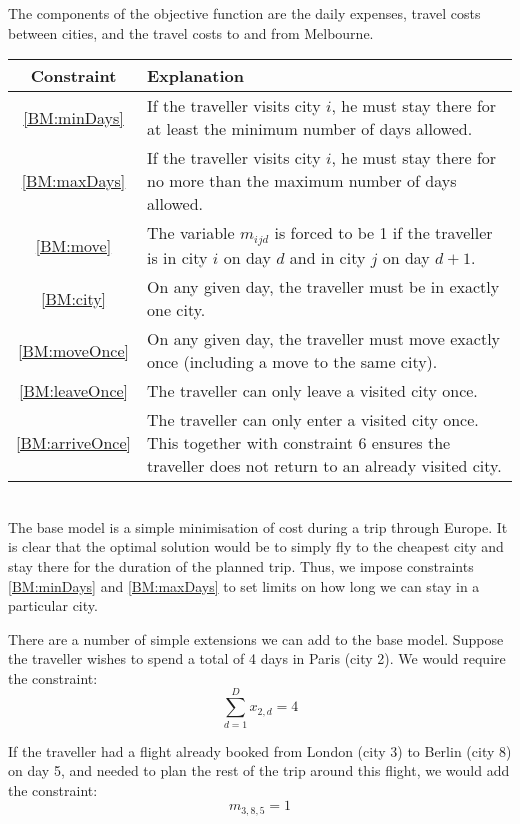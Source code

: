 \documentclass[12pt]{article}
\begin{document}
\newpage
The components of the objective function are the daily expenses, travel costs between cities, and the travel costs to and from Melbourne.\vspace{5mm}\\
\begin{tabular}{c | p{14cm} }
\hline
	\textbf{Constraint} & \textbf{Explanation} \\
	\hline
	\ref{BM:minDays} & If the traveller visits city $i$, he must stay there for at least the minimum number of days allowed. \\
	\hline
	\ref{BM:maxDays} &  If the traveller visits city $i$, he must stay there for no more than the maximum number of days allowed. \\
	\hline
	\ref{BM:move} & The variable $m_{ijd}$ is forced to be 1 if the traveller is in city $i$ on day $d$ and in city $j$ on day $d+1$. \\
	\hline
	\ref{BM:city} & On any given day, the traveller must be in exactly one city. \\
	\hline
	\ref{BM:moveOnce} & On any given day, the traveller must move exactly once (including a move to the same city). \\
	\hline
	\ref{BM:leaveOnce} & The traveller can only leave a visited city once. \\
	\hline
	\ref{BM:arriveOnce} & The traveller can only enter a visited city once. This together with constraint 6 ensures the traveller does not return to an already visited city. \\\hline
\end{tabular}\\

The base model is a simple minimisation of cost during a trip through Europe. It is clear that the optimal solution would be to simply fly to the cheapest city and stay there for the duration of the planned trip. Thus, we impose constraints \ref{BM:minDays} and \ref{BM:maxDays} to set limits on how long we can stay in a particular city.

There are a number of simple extensions we can add to the base model. Suppose the traveller wishes to spend a total of 4 days in Paris (city 2). We would require the constraint:
\begin{equation*}
\sum_{d=1}^{D} x_{2,d} = 4
\end{equation*}

If the traveller had a flight already booked from London (city 3) to Berlin (city 8) on day 5, and needed to plan the rest of the trip around this flight, we would add the constraint:
\begin{equation*}
m_{3,8,5} = 1
\end{equation*}
\end{document}
